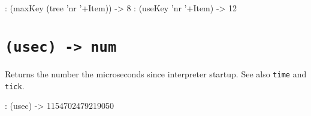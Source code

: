 \begin{wideverbatim}
: (maxKey (tree 'nr '+Item))
-> 8
: (useKey 'nr '+Item)
-> 12
\end{wideverbatim}

 
\section*{\texttt{(usec) -> num}}
\label{sec:func-ref-U-(usec) -> num}


Returns the number the microseconds since interpreter startup. See also
\texttt{time} and \texttt{tick}.


\begin{wideverbatim}
: (usec)
-> 1154702479219050
\end{wideverbatim}

